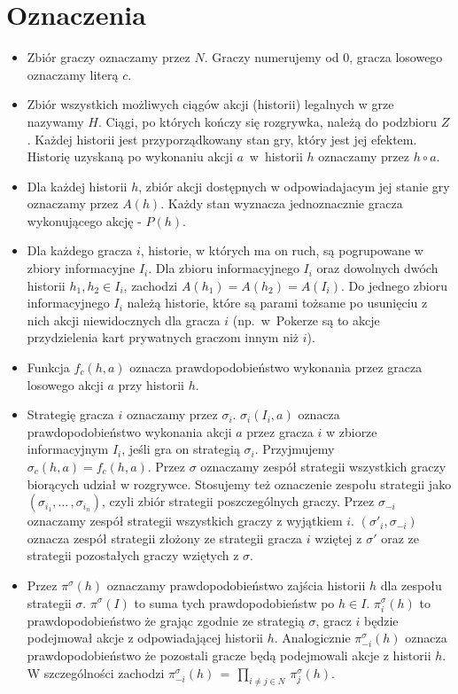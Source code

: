 \documentclass[magisterska]{pracamgr}
\begin{document}
\section{Oznaczenia}
\label{oznaczenia}

\begin{itemize}

\item Zbiór graczy oznaczamy przez $N$. Graczy numerujemy od $0$, gracza losowego oznaczamy literą $c$.
\item Zbiór wszystkich możliwych ciągów akcji (historii) legalnych w grze nazywamy $H$. Ciągi, po których kończy
      się rozgrywka, należą do podzbioru $Z$. Każdej historii jest przyporządkowany stan gry, który
      jest jej efektem. Historię uzyskaną po wykonaniu akcji $a$~w~historii $h$ oznaczamy przez $h \circ a$.
\item Dla każdej historii $h$, zbiór akcji dostępnych w odpowiadajacym jej stanie gry oznaczamy przez $A(h)$.
      Każdy stan wyznacza jednoznacznie gracza wykonującego akcję - $P(h)$.
\item Dla każdego gracza $i$, historie, w których ma on ruch, są pogrupowane w zbiory informacyjne $I_i$. Dla zbioru
      informacyjnego $I_i$ oraz dowolnych dwóch historii $h_1, h_2 \in I_i$, zachodzi $A(h_1) = A(h_2) = A(I_i)$. Do jednego
      zbioru informacyjnego $I_i$ należą historie, które są parami tożsame po usunięciu z nich akcji niewidocznych dla gracza $i$
      (np.~w~Pokerze są to akcje przydzielenia kart prywatnych graczom innym niż $i$).
\item Funkcja $f_c(h, a)$ oznacza prawdopodobieństwo wykonania przez gracza losowego akcji $a$ przy historii $h$.
\item Strategię gracza $i$ oznaczamy przez $\sigma_i$. $\sigma_i(I_i, a)$ oznacza prawdopodobieństwo wykonania akcji $a$ przez
      gracza $i$ w zbiorze informacyjnym $I_i$, jeśli gra on strategią $\sigma_i$. Przyjmujemy $\sigma_c(h, a) = f_c(h, a)$.
      Przez $\sigma$ oznaczamy zespół strategii wszystkich graczy biorących udział w rozgrywce. Stosujemy też oznaczenie
      zespołu strategii jako $(\sigma_{i_1}, ... \, , \sigma_{i_n})$, czyli zbiór strategii poszczególnych graczy. Przez $\sigma_{-i}$ oznaczamy
      zespół strategii wszystkich graczy z wyjątkiem $i$. $(\sigma'_i, \sigma_{-i})$ oznacza zespół strategii złożony ze strategii
      gracza $i$ wziętej z $\sigma'$ oraz ze strategii pozostałych graczy wziętych z $\sigma$.
\item Przez $\pi^{\sigma}(h)$ oznaczamy prawdopodobieństwo zajścia historii $h$ dla zespołu strategii $\sigma$.
      $\pi^{\sigma}(I)$ to suma tych prawdopodobieństw po $h \in I$. $\pi_i^{\sigma}(h)$ to prawdopodobieństwo że grając
      zgodnie ze strategią $\sigma$, gracz $i$ będzie podejmował akcje z odpowiadającej historii $h$. Analogicznie
      $\pi_{-i}^{\sigma}(h)$ oznacza prawdopodobieństwo że pozostali gracze będą podejmowali akcje z historii $h$. W szczególności
      zachodzi $\pi_{-i}^{\sigma}(h) \, = \, \prod\limits_{i \neq j \in N} \, \pi_j^{\sigma}(h)$.
\end{itemize}
\end{document}
